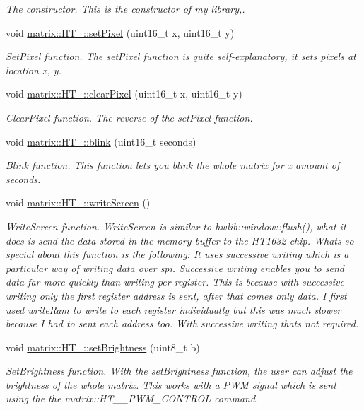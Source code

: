\begin{DoxyCompactItemize}
\begin{DoxyCompactList}\small\item\em The constructor. This is the constructor of my library,. \end{DoxyCompactList}\item 
void \hyperlink{group___h_t__1632_ga41e8cf0207f395b420124b73555abea1}{matrix\+::\+H\+T\+\_\+::set\+Pixel} (uint16\+\_\+t x, uint16\+\_\+t y)
\begin{DoxyCompactList}\small\item\em Set\+Pixel function. The set\+Pixel function is quite self-\/explanatory, it sets pixels at location x, y. \end{DoxyCompactList}\item 
void \hyperlink{group___h_t__1632_ga51370333005f486fb0d2877fe459e596}{matrix\+::\+H\+T\+\_\+::clear\+Pixel} (uint16\+\_\+t x, uint16\+\_\+t y)
\begin{DoxyCompactList}\small\item\em Clear\+Pixel function. The reverse of the set\+Pixel function. \end{DoxyCompactList}\item 
void \hyperlink{group___h_t__1632_gac1c948d2a7639d54c6cc2a0d6aee0d2f}{matrix\+::\+H\+T\+\_\+::blink} (uint16\+\_\+t seconds)
\begin{DoxyCompactList}\small\item\em Blink function. This function lets you blink the whole matrix for x amount of seconds. \end{DoxyCompactList}\item 
void \hyperlink{group___h_t__1632_ga5ed82c4f2f682bcd439aa8a745f01f0f}{matrix\+::\+H\+T\+\_\+::write\+Screen} ()
\begin{DoxyCompactList}\small\item\em Write\+Screen function. Write\+Screen is similar to hwlib\+::window\+::flush(), what it does is send the data stored in the memory buffer to the H\+T1632 chip. What\textquotesingle{}s so special about this function is the following\+: It uses \textquotesingle{}successive writing\textquotesingle{} which is a particular way of writing data over spi. Successive writing enables you to send data far more quickly than writing per register. This is because with successive writing only the first register address is sent, after that comes only data. I first used write\+Ram to write to each register individually but this was much slower because I had to sent each address too. With successive writing that\textquotesingle{}s not required. \end{DoxyCompactList}\item 
void \hyperlink{group___h_t__1632_ga942af7e6d95cc5d44778cb5ba2f56b36}{matrix\+::\+H\+T\+\_\+::set\+Brightness} (uint8\+\_\+t b)
\begin{DoxyCompactList}\small\item\em Set\+Brightness function. With the set\+Brightness function, the user can adjust the brightness of the whole matrix. This works with a P\+WM signal which is sent using the the matrix\+::\+H\+T\+\_\+\_\+\+P\+W\+M\+\_\+\+C\+O\+N\+T\+R\+OL command. \end{DoxyCompactList}\end{DoxyCompactItemize}
